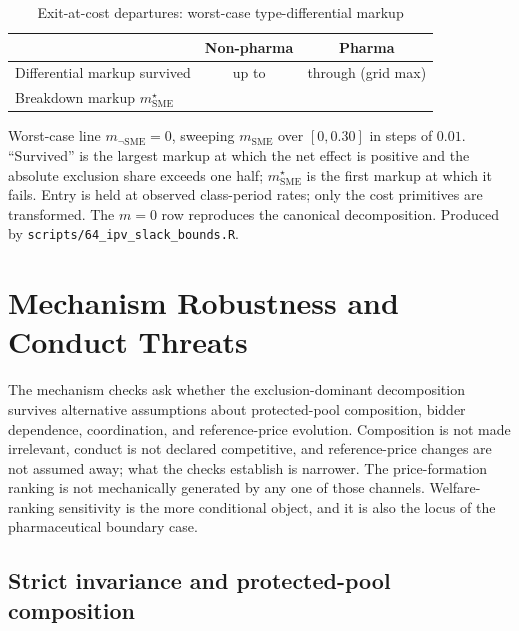 \documentclass[12pt]{article}
\begin{document}
\begin{table}[!htbp]
\centering
\begin{threeparttable}
\caption{Exit-at-cost departures: worst-case type-differential markup}
\label{oa:tab_ipv_slack}
\small
\setlength{\tabcolsep}{6pt}
\begin{tabular}{lcc}
\toprule
 & Non-pharma & Pharma \\
\midrule
Differential markup survived & up to \ipvSlackLastOkNp{} & through \ipvSlackLastOkPh{} (grid max) \\
Breakdown markup $m_{\mathrm{SME}}^\star$ & \ipvSlackBreakNp{} & \ipvSlackBreakPh{} \\
\bottomrule
\end{tabular}
\begin{tablenotes}\footnotesize
\item Worst-case line $m_{\neg\mathrm{SME}}=0$, sweeping $m_{\mathrm{SME}}$ over
$[0,0.30]$ in steps of $0.01$. ``Survived'' is the largest markup at which the
net effect is positive and the absolute exclusion share exceeds one half;
$m_{\mathrm{SME}}^\star$ is the first markup at which it fails. Entry is held at
observed class-period rates; only the cost primitives are transformed. The
$m=0$ row reproduces the canonical decomposition. Produced by
\texttt{scripts/64\_ipv\_slack\_bounds.R}.
\end{tablenotes}
\end{threeparttable}
\end{table}

\section{Mechanism Robustness and Conduct Threats}

The mechanism checks ask whether the exclusion-dominant decomposition
survives alternative assumptions about protected-pool composition, bidder
dependence, coordination, and reference-price evolution. Composition is
not made irrelevant, conduct is not declared competitive, and
reference-price changes are not assumed away; what the checks establish
is narrower. The price-formation ranking is not mechanically generated by
any one of those channels. Welfare-ranking sensitivity is the more
conditional object, and it is also the locus of the pharmaceutical
boundary case.

\subsection{Strict invariance and protected-pool composition}
\end{document}
